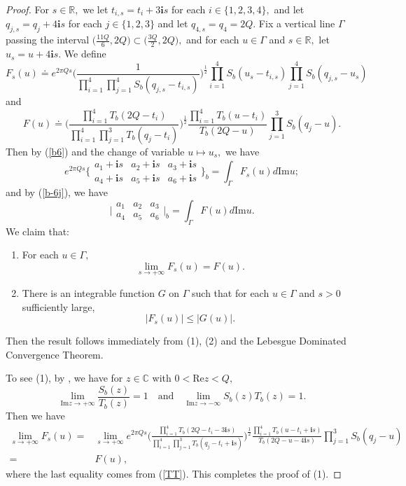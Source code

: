 \documentclass[11pt]{article}
\theoremstyle{remark}
\theoremstyle{remark}
\numberwithin{equation}{section}
\begin{document}
\begin{proof} For $s\in\mathbb R,$ we let $t_{i,s}=t_i+ 3\mathbf is$ for each $i\in\{1,2,3,4\},$ and let $q_{j,s}=q_j+4\mathbf is$ for each $j\in\{1,2,3\}$ and let $q_{4,s}=q_4=2Q.$ Fix a vertical line $\Gamma$ passing the interval $\big(\frac{11Q}{6},2Q\big)\subset\big(\frac{3Q}{2},2Q\big),$ and for each $u\in \Gamma$ and $s\in\mathbb R,$ let 
$u_s=u+4\mathbf i s.$ We define
$$F_s(u)\doteq e^{2\pi Qs}\Bigg(\frac{1}{\prod_{i=1}^4\prod_{j=1}^4S_b(q_{j,s}-t_{i,s})}\Bigg)^{\frac{1}{2}} \prod_{i=1}^4S_b(u_s-t_{i,s})\prod_{j=1}^4S_b(q_{j,s}-u_s)$$
and 
$$F(u)\doteq \Bigg(\frac{\prod_{i=1}^4 T_b(2Q-t_i)}{\prod_{i=1}^4\prod _{j=1}^3 T_b(q_j-t_i)}\Bigg)^{\frac{1}{2}} \frac{\prod_{i=1}^4 T_b(u-t_i)}{T_b(2Q-u)}\prod_{j=1}^3S_b(q_j-u).$$
Then by (\ref{b6}) and the change of variable $u\mapsto u_s,$ we have 
$$e^{2\pi Q s} \bigg\{\begin{matrix} a_1+\mathbf is & a_2 +\mathbf is & a_3+\mathbf is  \\ a_4+\mathbf is & a_5+\mathbf is & a_6+\mathbf is \end{matrix} \bigg\}_b=\int_\Gamma F_s(u)d\mathrm{Im}u;$$
and by (\ref{b-6j}), we have
$$ \bigg|\begin{matrix} a_1 & a_2 & a_3  \\ a_4 & a_5 & a_6 \end{matrix} \bigg|_b=\int_\Gamma F(u)d\mathrm{Im}u.$$
We claim that:
\begin{enumerate}[(1)]
    \item For each $u\in\Gamma,$
$$\lim_{s\to +\infty} F_s(u) = F(u).$$
    \item There is an integrable function $G$ on $\Gamma$ such that for each $u\in \Gamma$ and $s>0$ sufficiently large, 
    $$|F_s(u)|\leqslant |G(u)|.$$
\end{enumerate}
Then the result follows immediately from (1), (2) and the Lebesgue Dominated Convergence Theorem. 
\medskip


To see (1), by \cite[Formula (B.53)]{E}, we have for $z\in\mathbb C$ with $0<\mathrm{Re}z<Q,$
\begin{equation}\label{ST}
\lim_{\mathrm{Im}z\to +\infty} \frac{S_b(z)}{T_b(z)}=1\quad\text{and}\quad\lim_{\mathrm{Im}z\to -\infty} {S_b(z)}{T_b(z)}=1.
\end{equation}
Then we have 
\begin{equation*}
\begin{split}
  \lim_{s\to +\infty} F_s(u)= & \lim_{s\to +\infty} e^{2\pi Qs} \Bigg(\frac{\prod_{i=1}^4 T_b(2Q-t_i-3\mathbf is)}{\prod_{i=1}^4\prod _{j=1}^3 T_b(q_j-t_i+\mathbf is)}\Bigg)^{\frac{1}{2}} \frac{\prod_{i=1}^4 T_b(u-t_i+\mathbf is)}{T_b(2Q-u-4\mathbf is)}\prod_{j=1}^3S_b(q_j-u) \\
=& F(u),
\end{split}
\end{equation*}
where the last equality comes from (\ref{TT}). This completes the proof of (1).
\medskip


\end{proof}
\end{document}
